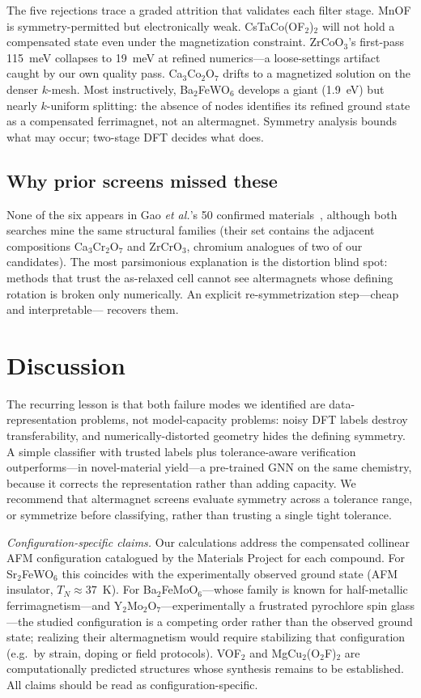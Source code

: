 \documentclass[aps,prmaterials,twocolumn,superscriptaddress,showkeys]{revtex4-2}
\begin{document}
The five rejections trace a graded attrition that validates each filter stage.
MnOF is symmetry-permitted but electronically weak. CsTaCo(OF$_2$)$_2$ will not
hold a compensated state even under the magnetization constraint. ZrCoO$_3$'s
first-pass 115~meV collapses to 19~meV at refined numerics---a loose-settings
artifact caught by our own quality pass. Ca$_3$Co$_2$O$_7$ drifts to a
magnetized solution on the denser $k$-mesh. Most instructively,
Ba$_2$FeWO$_6$ develops a giant (1.9~eV) but nearly $k$-uniform splitting: the
absence of nodes identifies its refined ground state as a compensated
ferrimagnet, not an altermagnet. Symmetry analysis bounds what may occur;
two-stage DFT decides what does.

\subsection{Why prior screens missed these}

None of the six appears in Gao \textit{et al.}'s 50 confirmed
materials~\cite{Gao2025}, although both searches mine the same structural
families (their set contains the adjacent compositions Ca$_3$Cr$_2$O$_7$ and
ZrCrO$_3$, chromium analogues of two of our candidates). The most parsimonious
explanation is the distortion blind spot: methods that trust the as-relaxed
cell cannot see altermagnets whose defining rotation is broken only
numerically. An explicit re-symmetrization step---cheap and interpretable---
recovers them.

\section{Discussion}

The recurring lesson is that both failure modes we identified are
data-representation problems, not model-capacity problems: noisy DFT labels
destroy transferability, and numerically-distorted geometry hides the defining
symmetry. A simple classifier with trusted labels plus tolerance-aware
verification outperforms---in novel-material yield---a pre-trained GNN on the
same chemistry, because it corrects the representation rather than adding
capacity. We recommend that altermagnet screens evaluate symmetry across a
tolerance range, or symmetrize before classifying, rather than trusting a
single tight tolerance.

\textit{Configuration-specific claims.} Our calculations address the
compensated collinear AFM configuration catalogued by the Materials Project for
each compound. For Sr$_2$FeWO$_6$ this coincides with the experimentally
observed ground state (AFM insulator, $T_N \approx 37$~K). For
Ba$_2$FeMoO$_6$---whose family is known for half-metallic ferrimagnetism---and
Y$_2$Mo$_2$O$_7$---experimentally a frustrated pyrochlore spin glass---the
studied configuration is a competing order rather than the observed ground
state; realizing their altermagnetism would require stabilizing that
configuration (e.g.\ by strain, doping or field protocols). VOF$_2$ and
MgCu$_2$(O$_2$F)$_2$ are computationally predicted structures whose synthesis
remains to be established. All claims should be read as
configuration-specific.
\end{document}
